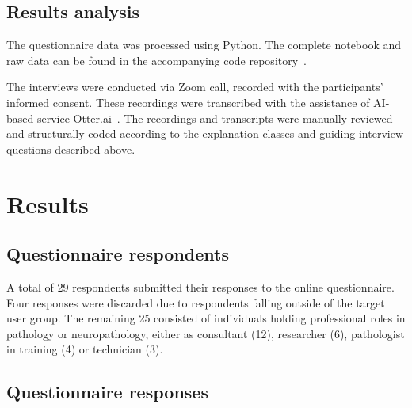 \documentclass[final,5p,times,twocolumn,hyphens]{elsarticle}
\begin{document}
\subsection{Results analysis}

The questionnaire data was processed using Python. The complete notebook and raw data can be found in the accompanying code repository~\cite{Evans_xAI_in_Digital_2022}.

The interviews were conducted via Zoom call, recorded with the participants' informed consent. These recordings were transcribed with the assistance of AI-based service Otter.ai~\cite{otterai-2021}. The recordings and transcripts were manually reviewed and structurally coded according to the explanation classes and guiding interview questions described above.

\section{Results}
\label{sec:results}

\subsection{Questionnaire respondents}

A total of 29 respondents submitted their responses to the online questionnaire. Four responses were discarded due to respondents falling outside of the target user group. The remaining 25 consisted of individuals holding professional roles in pathology or neuropathology, either as consultant (12), researcher (6), pathologist in training (4) or technician (3). 

\subsection{Questionnaire responses}
\end{document}

